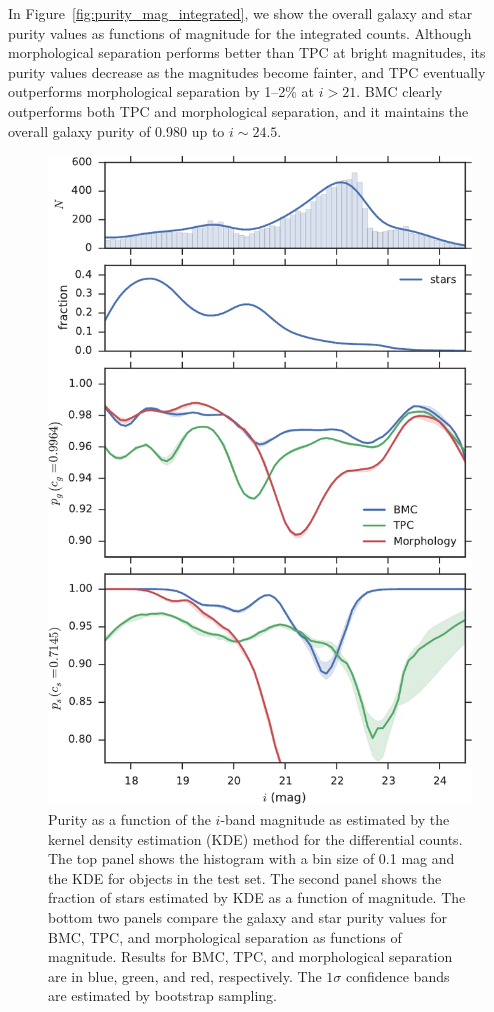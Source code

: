 \documentclass[useAMS,usenatbib]{mn2e}
\begin{document}
In Figure~\ref{fig:purity_mag_integrated}, we show
the overall galaxy and star purity values as functions of magnitude
for the integrated counts.
Although morphological separation performs better than TPC
at bright magnitudes, its purity values decrease as 
the magnitudes become fainter, and
TPC eventually outperforms morphological separation by 1--2\% at
$i > 21$.
BMC clearly outperforms both TPC and morphological separation,
and it maintains the overall galaxy purity of 0.980
up to $i \sim 24.5$.


\begin{figure}
  \centering
  \includegraphics[width=\columnwidth]{figures/purity_mag.pdf}
  \caption{Purity as a function of the $i$-band magnitude
           as estimated by the kernel density estimation (KDE) method
           for the differential counts.
           The top panel shows the histogram with a bin size of 0.1 mag
           and the KDE for objects in the test set.
           The second panel shows the fraction of stars estimated by KDE
           as a function of magnitude.
           The bottom two panels compare
           the galaxy and star purity values for BMC, TPC, and 
           morphological separation as functions of magnitude.
           Results for BMC, TPC, and morphological separation are in
           blue, green, and red, respectively.
           The $1 \sigma$ confidence bands are estimated by
           bootstrap sampling.}
  \label{fig:purity_mag}
\end{figure}
\end{document}

